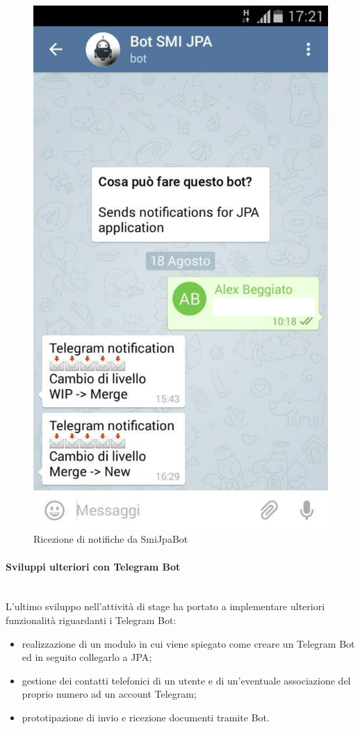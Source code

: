 \begin{figure}%
\centering
\includegraphics[width=.5\columnwidth]{immagini/telegram-screen}
\caption{Ricezione di notifiche da SmiJpaBot}
\label{fig:screen-telegram}%
\end{figure}

\paragraph{Sviluppi ulteriori con Telegram Bot} \mbox{} \\

L'ultimo sviluppo nell'attività di stage ha portato a implementare ulteriori
funzionalità riguardanti i Telegram Bot:

\begin{itemize}
\item realizzazione di un modulo in cui viene spiegato come creare un Telegram
  Bot ed in seguito collegarlo a JPA;
\item gestione dei contatti telefonici di un utente e di un'eventuale
  associazione del proprio numero ad un account Telegram;
\item prototipazione di invio e ricezione documenti tramite Bot.
\end{itemize}

